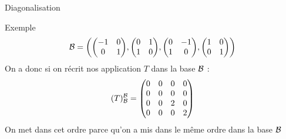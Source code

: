 \begin{parag}{Diagonalisation}
\begin{subparag}{Exemple}
            \[\bmath = \left(\begin{pmatrix}
                -1 & 0\\0&1
            \end{pmatrix}, \begin{pmatrix}
                0 & 1\\1 & 0
            \end{pmatrix}, \begin{pmatrix}
                0 & -1 \\ 1 & 0
            \end{pmatrix}, \begin{pmatrix}
                1 & 0 \\ 0 & 1
            \end{pmatrix}\right)\]
            On a donc si on récrit nos application $T$ dans la base $\mathcal{B}$ : 
            \[(T)_{\mathcal{B}}^{\mathcal{B}} = \begin{pmatrix}
                0 & 0 & 0 & 0\\
                0 & 0 & 0 & 0 \\
                0 & 0 & 2 & 0\\
                0 &0 & 0 & 2
            \end{pmatrix}\]
            On met dans cet ordre parce qu'on a mis dans le même ordre dans la base $\mathcal{B}$
    \end{subparag}
\end{parag}


